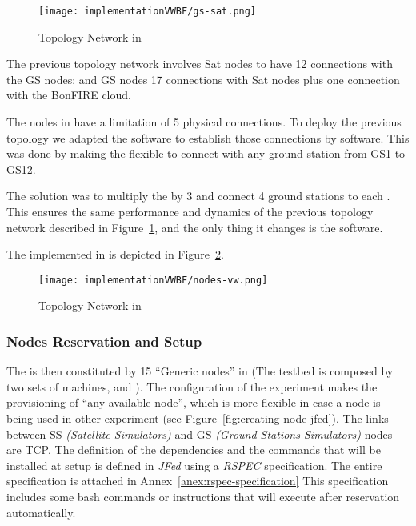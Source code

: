 \begin{figure}[!h]
\begin{center}
\texttt{[image: implementationVWBF/gs-sat.png]}

\caption{Topology Network in \vw}
\label{fig:impl-topology-vw}
\end{center}
\end{figure}



The previous topology network involves Sat nodes to have 12 connections with the GS nodes; and GS nodes 17 connections with Sat nodes plus one connection with the BonFIRE cloud.

The nodes in \vw have a limitation of 5 physical connections. To deploy the previous
topology we adapted the \sss software to establish those connections by software. This was
done by making the \satss flexible to connect with any ground station from GS1 to GS12. 

The solution was to multiply the \satss by 3 and connect 4 ground stations to each \satss. This ensures the same performance and dynamics of the previous topology network described in Figure~\ref{fig:impl-topology-vw}, and the only thing it changes is the software.

The \sss implemented in \vw is depicted in Figure~\ref{fig:impl-nodes-vw}.

\begin{figure}[!h]
\begin{center}
\texttt{[image: implementationVWBF/nodes-vw.png]}

\caption{Topology Network in \vw}
\label{fig:impl-nodes-vw}
\end{center}
\end{figure}



\subsubsection{Nodes Reservation and Setup}

The \sss is then constituted by 15 ``Generic nodes'' in  (The \vw
testbed is composed by two sets of machines,  and ). The configuration of the experiment makes the provisioning of ``any available node'',
which is more flexible in case a node is being used in other experiment (see Figure~\ref{fig:creating-node-jfed}). The links between SS \emph{(Satellite Simulators)} and GS \emph{(Ground Stations Simulators)} nodes
are \ac{TCP}. The definition of the dependencies and the commands that will be installed at
setup is defined in \emph{JFed} using a \emph{RSPEC} specification. The entire specification is
attached in Annex~\ref{anex:rspec-specification}  This specification includes some
bash commands or instructions that will execute after reservation automatically.


